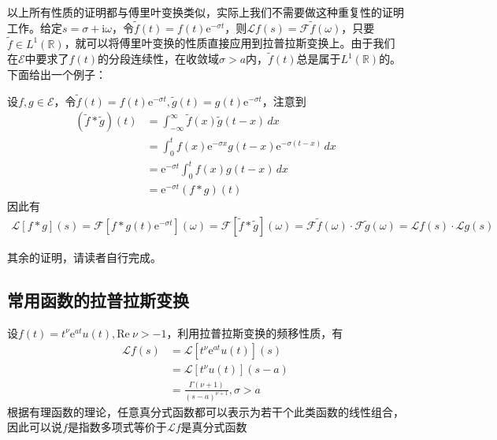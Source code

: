 \documentclass{ctexbook}
\begin{document}
以上所有性质的证明都与傅里叶变换类似，实际上我们不需要做这种重复性的证明工作。给定$s=\sigma+\mathrm{i}\omega$，令$\tilde{f}(t)=f(t)\mathrm{e}^{-\sigma t}$，则$\mathcal{L} f(s)=\mathcal{F} \tilde{f}(\omega)$，只要$\tilde{f}\in L^1(\mathbb{R} )$，就可以将傅里叶变换的性质直接应用到拉普拉斯变换上。由于我们在$\mathcal{E} $中要求了$f(t)$的分段连续性，在收敛域$\sigma>a$内，$\tilde{f}(t)$总是属于$L^1(\mathbb{R})$的。下面给出一个例子：
\begin{example}[卷积定理]
设$f,g\in\mathcal{E} $，令$\tilde{f}(t)=f(t)\mathrm{e}^{-\sigma t}, \tilde{g}(t)=g(t)\mathrm{e}^{-\sigma t}$，注意到\begin{align*}
    (\tilde{f}*\tilde{g})(t)&=\int_{-\infty}^{\infty}\tilde{f}(x)\tilde{g}(t-x)\,dx\\
    &=\int_0^{t}f(x)\mathrm{e}^{-\sigma x}g(t-x)\mathrm{e}^{-\sigma (t-x)}\,dx\\
    &=\mathrm{e}^{-\sigma t}\int_0^{t}f(x)g(t-x)\,dx\\
    &=\mathrm{e}^{-\sigma t}(f*g)(t)
\end{align*}
因此有
    \begin{align*}
        \mathcal{L} \left[f*g\right](s)=\mathcal{F} \left[f*g(t)\mathrm{e}^{-\sigma t}\right](\omega)=\mathcal{F} \left[\tilde{f}*\tilde{g}\right](\omega)=\mathcal{F} \tilde{f}(\omega)\cdot \mathcal{F} \tilde{g}(\omega)=\mathcal{L} f(s)\cdot \mathcal{L} g(s)
    \end{align*}
\end{example}
其余的证明，请读者自行完成。

\subsection{常用函数的拉普拉斯变换}\label{sub:ordinary_laplace}

\begin{example}[指数多项式]
    设$f(t)=t^\nu \mathrm{e}^{a t}u(t),\text{Re}\ \nu>-1$，利用拉普拉斯变换的频移性质，有
    \begin{align*}
        \mathcal{L} f(s)&=\mathcal{L}\left[t^\nu \mathrm{e}^{a t}u(t)\right](s)\\
        &=\mathcal{L} \left[t^\nu u(t)\right](s-a)\\
        &=\frac{\Gamma(\nu+1)}{(s-a)^{\nu+1}},\sigma>a
    \end{align*}
    根据有理函数的理论，任意真分式函数都可以表示为若干个此类函数的线性组合，因此可以说$f$是指数多项式等价于$\mathcal{L} f$是真分式函数
\end{example}
\end{document}
